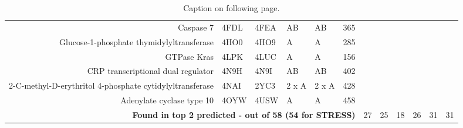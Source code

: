 \begin{table}
\begin{changemargin}{15mm}
\begin{scriptsize}
\begin{tabular}{ r p{0.8cm} p{0.8cm} p{0.8cm} p{0.8cm} l l l l l l l }
Caspase 7                                                & 4FDL & 4FEA & AB    & AB    & 365 & \cellcolor[rgb]{ 1,  .494,  .475}    & \cellcolor[rgb]{ .573,  .816,  .314} & \cellcolor[rgb]{ .573,  .816,  .314} & \cellcolor[rgb]{ 1,  .494,  .475}    & \cellcolor[rgb]{ .573,  .816,  .314} & \cellcolor[rgb]{ 1,  .494,  .475}    \\
Glucose-1-phosphate thymidylyltransferase                & 4HO0 & 4HO9 & A     & A     & 285 & \cellcolor[rgb]{ .573,  .816,  .314} & \cellcolor[rgb]{ .573,  .816,  .314} & \cellcolor[rgb]{ 1,  .494,  .475}    & \cellcolor[rgb]{ 1,  .494,  .475}    & \cellcolor[rgb]{ .573,  .816,  .314} & \cellcolor[rgb]{ 1,  .494,  .475}    \\
GTPase Kras                                              & 4LPK & 4LUC & A     & A     & 156 & \cellcolor[rgb]{ .573,  .816,  .314} & \cellcolor[rgb]{ .573,  .816,  .314} & \cellcolor[rgb]{ 1,  1,  0}          & \cellcolor[rgb]{ .573,  .816,  .314} & \cellcolor[rgb]{ .573,  .816,  .314} & \cellcolor[rgb]{ .573,  .816,  .314} \\
CRP transcriptional dual regulator                       & 4N9H & 4N9I & AB    & AB    & 402 & \cellcolor[rgb]{ .573,  .816,  .314} & \cellcolor[rgb]{ .573,  .816,  .314} & \cellcolor[rgb]{ .573,  .816,  .314} & \cellcolor[rgb]{ .573,  .816,  .314} & \cellcolor[rgb]{ .573,  .816,  .314} & \cellcolor[rgb]{ .573,  .816,  .314} \\
2-C-methyl-D-erythritol 4-phosphate cytidylyltransferase & 4NAI & 2YC3 & 2 x A & 2 x A & 428 & \cellcolor[rgb]{ 1,  .494,  .475}    & \cellcolor[rgb]{ 1,  .494,  .475}    & \cellcolor[rgb]{ 1,  .494,  .475}    & \cellcolor[rgb]{ 1,  .494,  .475}    & \cellcolor[rgb]{ 1,  .494,  .475}    & \cellcolor[rgb]{ .573,  .816,  .314} \\
Adenylate cyclase type 10                                & 4OYW & 4USW & A     & A     & 458 & \cellcolor[rgb]{ 1,  .494,  .475}    & \cellcolor[rgb]{ 1,  .494,  .475}    & \cellcolor[rgb]{ 1,  .494,  .475}    & \cellcolor[rgb]{ 1,  .494,  .475}    & \cellcolor[rgb]{ .573,  .816,  .314} & \cellcolor[rgb]{ .573,  .816,  .314} \\
\hline
\multicolumn{6}{r}{\textbf{Found in top 2 predicted - out of 58 (54 for STRESS)}} & 27    & 25    & 18    & 26    & 31    & 31 \\
\hline
\end{tabular}
\end{scriptsize}

\end{changemargin}

\caption[Performance of allosteric site prediction methods on a dataset of 58 known allosteric proteins - detail]
{Caption on following page.}

\label{tab:allosteric_proteins}
\end{table}

